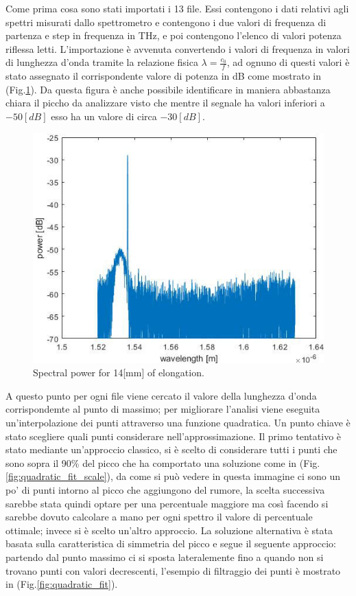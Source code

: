 \newpage
{}
Come prima cosa sono stati importati i 13 file. Essi contengono i dati relativi agli spettri misurati dallo spettrometro e contengono i due valori di frequenza di partenza e step in frequenza in THz, e poi contengono l'elenco di valori potenza riflessa letti. L'importazione è avvenuta convertendo i valori di frequenza in valori di lunghezza d'onda tramite la relazione fisica $\lambda = \frac{c_0}{f}$, ad ognuno di questi valori è stato assegnato il corrispondente valore di potenza in dB come mostrato in (Fig.\ref{fig:spectralPower}). Da questa figura è anche possibile identificare in maniera abbastanza chiara il piccho da analizzare visto che mentre il segnale ha valori inferiori a $-50[dB]$ esso ha un valore di circa $-30[dB]$.
\begin{figure}[h]
    \centering
    \includegraphics[scale=0.7]{img/spectralPower.jpg}
    \caption{Spectral power for 14[mm] of elongation.}
    \label{fig:spectralPower}
\end{figure}
A questo punto per ogni file viene cercato il valore della lunghezza d'onda corrispondemte al punto di massimo; per migliorare l'analisi viene eseguita un'interpolazione dei punti attraverso una funzione quadratica. Un punto chiave è stato scegliere quali punti considerare nell'approssimazione. Il primo tentativo è stato mediante un'approccio classico, si è scelto di considerare tutti i punti che sono sopra il 90\% del picco che ha comportato una soluzione come in (Fig.\ref{fig:quadratic_fit_scale}), da come si può vedere in questa immagine ci sono un po' di punti intorno al picco che aggiungono del rumore, la scelta successiva sarebbe stata quindi optare per una percentuale maggiore ma così facendo si sarebbe dovuto calcolare a mano per ogni spettro il valore di percentuale ottimale; invece si è scelto un'altro approccio. La soluzione alternativa è stata basata sulla caratteristica di simmetria del picco e segue il seguente approccio: partendo dal punto massimo ci si sposta lateralemente fino a quando non si trovano punti con valori decrescenti, l'esempio di filtraggio dei punti è mostrato in (Fig.\ref{fig:quadratic_fit}).

